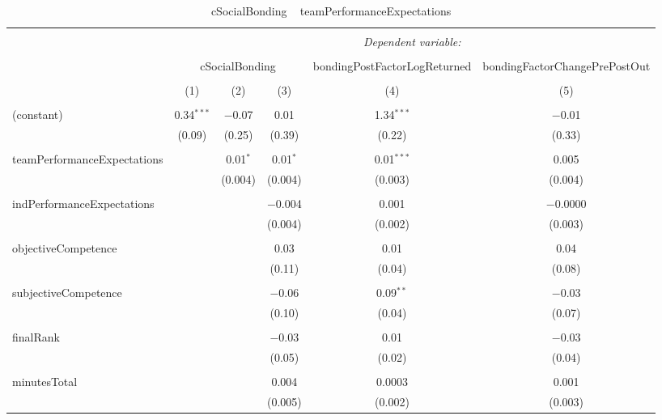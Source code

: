 
\begin{table}[!htbp] \centering 
  \caption{cSocialBonding ~ teamPerformanceExpectations} 
  \label{tab:MLM23bcBondingteamPerfExp} 
\scriptsize 
\begin{tabular}{@{\extracolsep{5pt}}lccccc} 
\\[-1.8ex]\hline 
\hline \\[-1.8ex] 
 & \multicolumn{5}{c}{\textit{Dependent variable:}} \\ 
\cline{2-6} 
\\[-1.8ex] & \multicolumn{3}{c}{cSocialBonding} & bondingPostFactorLogReturned & bondingFactorChangePrePostOut \\ 
\\[-1.8ex] & (1) & (2) & (3) & (4) & (5)\\ 
\hline \\[-1.8ex] 
 (constant) & 0.34$^{***}$ & $-$0.07 & 0.01 & 1.34$^{***}$ & $-$0.01 \\ 
  & (0.09) & (0.25) & (0.39) & (0.22) & (0.33) \\ 
  & & & & & \\ 
 teamPerformanceExpectations &  & 0.01$^{*}$ & 0.01$^{*}$ & 0.01$^{***}$ & 0.005 \\ 
  &  & (0.004) & (0.004) & (0.003) & (0.004) \\ 
  & & & & & \\ 
 indPerformanceExpectations &  &  & $-$0.004 & 0.001 & $-$0.0000 \\ 
  &  &  & (0.004) & (0.002) & (0.003) \\ 
  & & & & & \\ 
 objectiveCompetence &  &  & 0.03 & 0.01 & 0.04 \\ 
  &  &  & (0.11) & (0.04) & (0.08) \\ 
  & & & & & \\ 
 subjectiveCompetence &  &  & $-$0.06 & 0.09$^{**}$ & $-$0.03 \\ 
  &  &  & (0.10) & (0.04) & (0.07) \\ 
  & & & & & \\ 
 finalRank &  &  & $-$0.03 & 0.01 & $-$0.03 \\ 
  &  &  & (0.05) & (0.02) & (0.04) \\ 
  & & & & & \\ 
 minutesTotal &  &  & 0.004 & 0.0003 & 0.001 \\ 
  &  &  & (0.005) & (0.002) & (0.003) \\ 

\end{tabular}
\end{table}
